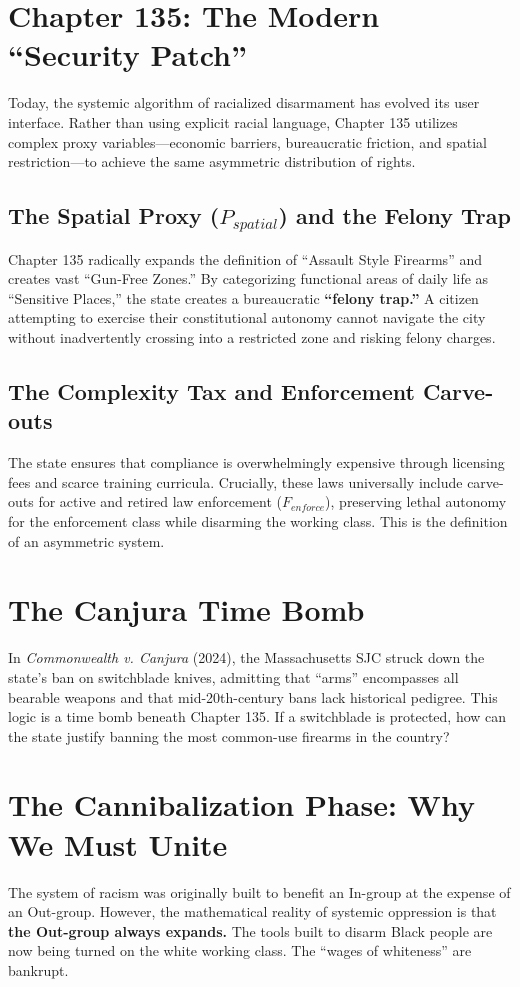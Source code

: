 \documentclass[12pt]{article}
\begin{document}
\section{Chapter 135: The Modern ``Security Patch''}
Today, the systemic algorithm of racialized disarmament has evolved its user interface. Rather than using explicit racial language, Chapter 135 utilizes complex proxy variables—economic barriers, bureaucratic friction, and spatial restriction—to achieve the same asymmetric distribution of rights.

\subsection{The Spatial Proxy ($P_{spatial}$) and the Felony Trap}
Chapter 135 radically expands the definition of ``Assault Style Firearms'' and creates vast ``Gun-Free Zones.'' By categorizing functional areas of daily life as ``Sensitive Places,'' the state creates a bureaucratic \textbf{``felony trap.''} A citizen attempting to exercise their constitutional autonomy cannot navigate the city without inadvertently crossing into a restricted zone and risking felony charges.

\subsection{The Complexity Tax and Enforcement Carve-outs}
The state ensures that compliance is overwhelmingly expensive through licensing fees and scarce training curricula. Crucially, these laws universally include carve-outs for active and retired law enforcement ($F_{enforce}$), preserving lethal autonomy for the enforcement class while disarming the working class. This is the definition of an asymmetric system.

\section{The Canjura Time Bomb}
In \textit{Commonwealth v. Canjura} (2024), the Massachusetts SJC struck down the state's ban on switchblade knives, admitting that ``arms'' encompasses all bearable weapons and that mid-20th-century bans lack historical pedigree. This logic is a time bomb beneath Chapter 135. If a switchblade is protected, how can the state justify banning the most common-use firearms in the country?

\section{The Cannibalization Phase: Why We Must Unite}
The system of racism was originally built to benefit an In-group at the expense of an Out-group. However, the mathematical reality of systemic oppression is that \textbf{the Out-group always expands.} The tools built to disarm Black people are now being turned on the white working class. The ``wages of whiteness'' are bankrupt. 
\end{document}

